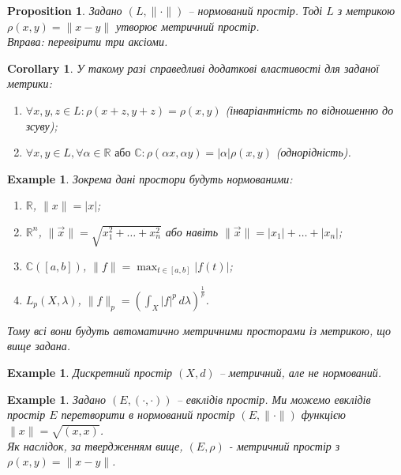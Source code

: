 \documentclass[a4paper, 10pt]{article}
\theoremstyle{theoremdd}
\theoremstyle{theoremdd}
\theoremstyle{theoremdd}
\theoremstyle{theoremdd}
\newtheorem{example}[theorem]{Example}
\theoremstyle{theoremdd}
\newtheorem{proposition}[theorem]{Proposition}
\theoremstyle{theoremdd}
\theoremstyle{theoremdd}
\theoremstyle{theoremdd}
\newtheorem{corollary}[theorem]{Corollary}
\begin{document}
\begin{proposition}
Задано $(L, \| \cdot \|)$ -- нормований простір. Тоді $L$ з метрикою $\rho(x,y) = \|x-y\|$ утворює метричний простір.\\
\textit{Вправа: перевірити три аксіоми.}
\end{proposition}

\begin{corollary}
У такому разі справедливі додаткові властивості для заданої метрики:
\begin{enumerate}[nosep,wide=0pt,label={\arabic*)}]
\item $\forall x,y,z \in L: \rho(x+z,y+z) = \rho(x,y)$ (інваріантність по відношенню до зсуву);
\item $\forall x,y \in L, \forall \alpha \in \mathbb{R} \text{ або } \mathbb{C}: \rho(\alpha x, \alpha y) = |\alpha| \rho(x,y)$ (однорідність).
\end{enumerate}
\end{corollary}

\begin{example}
Зокрема дані простори будуть нормованими:
\begin{enumerate}[nosep,wide=0pt,label={\arabic*)}]
\item $\mathbb{R}$, \qquad $\| x\| = |x|$;
\item $\mathbb{R}^n$, \qquad $\| \vec{x} \| = \sqrt{x_1^2 + \dots + x_n^2}$ або навіть $\| \vec{x} \| = |x_1| + \dots + |x_n|$;
\item $\mathbb{C}([a,b])$, \qquad $\displaystyle \| f\| = \max_{t \in [a,b]} |f(t)|$;
\item $L_p(X,\lambda)$, \qquad $\|f\|_p = \displaystyle\left(\int_X |f|^p\,d\lambda\right)^{\frac{1}{p}}$.
\end{enumerate}
Тому всі вони будуть автоматично метричними просторами із метрикою, що вище задана.
\end{example}

\begin{example}
Дискретний простір $(X,d)$ -- метричний, але не нормований.\\

\end{example}

\begin{example}
Задано $(E, (\cdot, \cdot))$ -- евклідів простір. Ми можемо евклідів простір $E$ перетворити в нормований простір $(E, \| \cdot \|)$ функцією $\|x\| = \sqrt{(x,x)}$.\\
Як наслідок, за твердженням вище, $(E, \rho)$ - метричний простір з $\rho(x,y) = \|x-y\|$.
\end{example}
\end{document}
